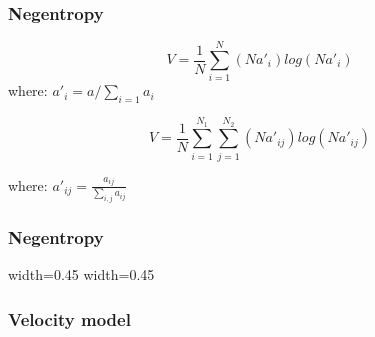 \begin{frame} \frametitle{Negentropy}
\begin{equation}
        V= \frac{1}{N} \sum_{i=1}^{N} (Na'_i)log(Na'_i)
\end{equation}
where: $ a'_i= a/ \sum_{i=1} a_i $

\begin{equation}
        V= \frac{1}{N} \sum_{i=1}^{N_1} \sum_{j=1}^{N_2} (Na'_{ij})log(Na'_{ij})
\end{equation}
\begin{tabbing}
 where: $ a'_{ij}= \frac{a_{ij}}{ \sum_{i,j} a_{ij}}$
\end{tabbing}


\end{frame}
\begin{frame} \frametitle{Negentropy}
   {width=0.45\textwidth} {}
   {width=0.45\textwidth} {}
\end{frame}

\begin{frame} \frametitle{Velocity model}
         {}
\end{frame}

